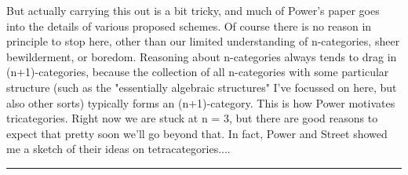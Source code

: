 But actually carrying this out is a bit tricky, and much of Power's
paper goes into the details of various proposed schemes.  Of
course there is no reason in principle to stop here, other
than our limited understanding of n-categories, sheer bewilderment,
or boredom.  Reasoning about n-categories always tends to
drag in (n+1)-categories, because the collection of all n-categories with 
some particular structure (such as the "essentially algebraic structures" 
I've focussed on here, but also other sorts) typically forms an 
(n+1)-category.  This is how Power motivates tricategories.  
Right now we are stuck at n = 3, but there are good 
reasons to expect that pretty soon we'll go beyond that.  In fact, 
Power and Street showed me a sketch of their ideas on tetracategories....
\par\noindent\rule{\textwidth}{0.4pt}

